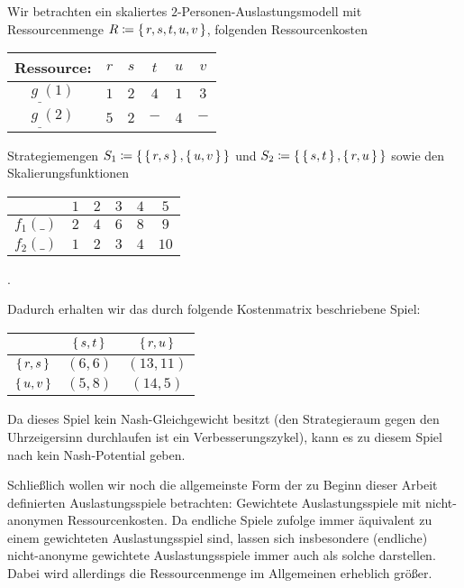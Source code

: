 \begin{bsp}\label{bsp:NichtSingeltonSkalAusl}
	Wir betrachten ein skaliertes $2$-Personen-Auslastungsmodell mit Ressourcenmenge $R \coloneqq \set{r, s, t, u, v}$, folgenden Ressourcenkosten
	\begin{center}\begin{tabular}{c|ccccc}
		Ressource:	& $r$ 	& $s$	& $t$	& $u$	& $v$	\\\hline\hline
		$g_{\_}(1)$	& $1$	& $2$	& $4$	& $1$	& $3$	\\\hline
		$g_{\_}(2)$	& $5$	& $2$ 	& $-$	& $4$	& $-$
	\end{tabular}\end{center}
	Strategiemengen $S_1 \coloneqq \set{\set{r,s}, \set{u,v}}$ und $S_2 \coloneqq \set{\set{s,t}, \set{r,u}}$ sowie den Skalierungsfunktionen
	\begin{center}\begin{tabular}{c|ccccc}
						& $1$ 	& $2$	& $3$	& $4$	& $5$	\\\hline\hline
			$f_1(\_)$	& $2$	& $4$	& $6$	& $8$	& $9$	\\\hline
			$f_2(\_)$	& $1$	& $2$ 	& $3$	& $4$	& $10$
	\end{tabular}.\end{center}
	Dadurch erhalten wir das durch folgende Kostenmatrix beschriebene Spiel:	
		\begin{center}\begin{tabular}{c||c|c}
						& $\set{s,t}$	& $\set{r,u}$	\\\hline\hline
			$\set{r,s}$	& $(6,6)$		& $(13,11)$		\\\hline
			$\set{u,v}$	& $(5,8)$		& $(14,5)$ 
		\end{tabular}\end{center}
	Da dieses Spiel kein Nash-Gleichgewicht besitzt (den Strategieraum gegen den Uhrzeigersinn durchlaufen ist ein Verbesserungszykel), kann es zu diesem Spiel nach  kein Nash-Potential geben.
\end{bsp}

Schließlich wollen wir noch die allgemeinste Form der zu Beginn dieser Arbeit definierten Auslastungsspiele betrachten: Gewichtete Auslastungsspiele mit nicht-anonymen Ressourcenkosten. Da endliche Spiele  zufolge immer äquivalent zu einem gewichteten Auslastungsspiel sind, lassen sich insbesondere (endliche) nicht-anonyme gewichtete Auslastungsspiele immer auch als solche darstellen. Dabei wird allerdings die Ressourcenmenge im Allgemeinen erheblich größer. 

